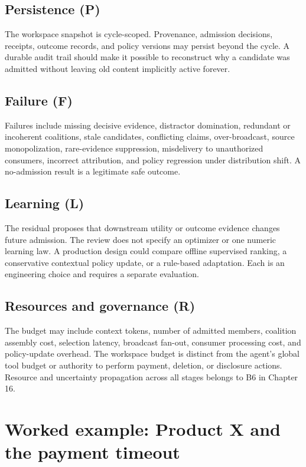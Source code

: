 \subsection{Persistence (P)}

The workspace snapshot is cycle-scoped. Provenance, admission decisions, receipts, outcome records, and policy versions may persist beyond the cycle. A durable audit trail should make it possible to reconstruct why a candidate was admitted without leaving old content implicitly active forever.

\subsection{Failure (F)}

Failures include missing decisive evidence, distractor domination, redundant or incoherent coalitions, stale candidates, conflicting claims, over-broadcast, source monopolization, rare-evidence suppression, misdelivery to unauthorized consumers, incorrect attribution, and policy regression under distribution shift. A no-admission result is a legitimate safe outcome.

\subsection{Learning (L)}

The residual proposes that downstream utility or outcome evidence changes future admission. The review does not specify an optimizer or one numeric learning law. A production design could compare offline supervised ranking, a conservative contextual policy update, or a rule-based adaptation. Each is an engineering choice and requires a separate evaluation.

\subsection{Resources and governance (R)}

The budget may include context tokens, number of admitted members, coalition assembly cost, selection latency, broadcast fan-out, consumer processing cost, and policy-update overhead. The workspace budget is distinct from the agent's global tool budget or authority to perform payment, deletion, or disclosure actions. Resource and uncertainty propagation across all stages belongs to B6 in Chapter 16.

\section{Worked example: Product X and the payment timeout}
\label{sec:ch14-productx}

